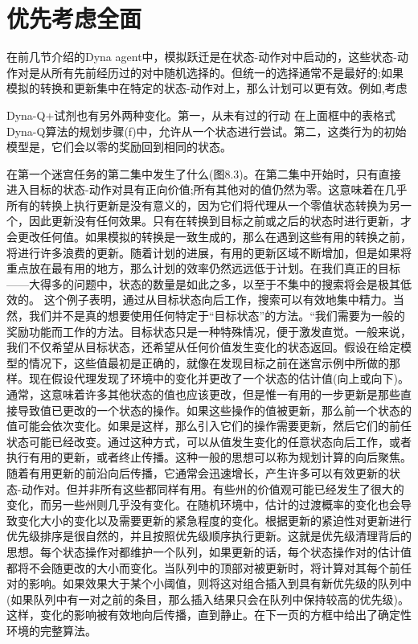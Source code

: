 \section{优先考虑全面}

在前几节介绍的Dyna agent中，模拟跃迁是在状态-动作对中启动的，这些状态-动作对是从所有先前经历过的对中随机选择的。但统一的选择通常不是最好的;如果模拟的转换和更新集中在特定的状态-动作对上，那么计划可以更有效。例如,考虑

Dyna-Q+试剂也有另外两种变化。第一，从未有过的行动
在上面框中的表格式Dyna-Q算法的规划步骤(f)中，允许从一个状态进行尝试。第二，这类行为的初始模型是，它们会以零的奖励回到相同的状态。

在第一个迷宫任务的第二集中发生了什么(图8.3)。在第二集中开始时，只有直接进入目标的状态-动作对具有正向价值;所有其他对的值仍然为零。这意味着在几乎所有的转换上执行更新是没有意义的，因为它们将代理从一个零值状态转换为另一个，因此更新没有任何效果。只有在转换到目标之前或之后的状态时进行更新，才会更改任何值。如果模拟的转换是一致生成的，那么在遇到这些有用的转换之前，将进行许多浪费的更新。随着计划的进展，有用的更新区域不断增加，但是如果将重点放在最有用的地方，那么计划的效率仍然远远低于计划。在我们真正的目标——大得多的问题中，状态的数量是如此之多，以至于不集中的搜索将会是极其低效的。
这个例子表明，通过从目标状态向后工作，搜索可以有效地集中精力。当然，我们并不是真的想要使用任何特定于“目标状态”的方法。“我们需要为一般的奖励功能而工作的方法。目标状态只是一种特殊情况，便于激发直觉。一般来说，我们不仅希望从目标状态，还希望从任何价值发生变化的状态返回。假设在给定模型的情况下，这些值最初是正确的，就像在发现目标之前在迷宫示例中所做的那样。现在假设代理发现了环境中的变化并更改了一个状态的估计值(向上或向下)。通常，这意味着许多其他状态的值也应该更改，但是惟一有用的一步更新是那些直接导致值已更改的一个状态的操作。如果这些操作的值被更新，那么前一个状态的值可能会依次变化。如果是这样，那么引入它们的操作需要更新，然后它们的前任状态可能已经改变。通过这种方式，可以从值发生变化的任意状态向后工作，或者执行有用的更新，或者终止传播。这种一般的思想可以称为规划计算的向后聚焦。
随着有用更新的前沿向后传播，它通常会迅速增长，产生许多可以有效更新的状态-动作对。但并非所有这些都同样有用。有些州的价值观可能已经发生了很大的变化，而另一些州则几乎没有变化。在随机环境中，估计的过渡概率的变化也会导致变化大小的变化以及需要更新的紧急程度的变化。根据更新的紧迫性对更新进行优先级排序是很自然的，并且按照优先级顺序执行更新。这就是优先级清理背后的思想。每个状态操作对都维护一个队列，如果更新的话，每个状态操作对的估计值都将不会随更改的大小而变化。当队列中的顶部对被更新时，将计算对其每个前任对的影响。如果效果大于某个小阈值，则将这对组合插入到具有新优先级的队列中(如果队列中有一对之前的条目，那么插入结果只会在队列中保持较高的优先级)。这样，变化的影响被有效地向后传播，直到静止。在下一页的方框中给出了确定性环境的完整算法。

